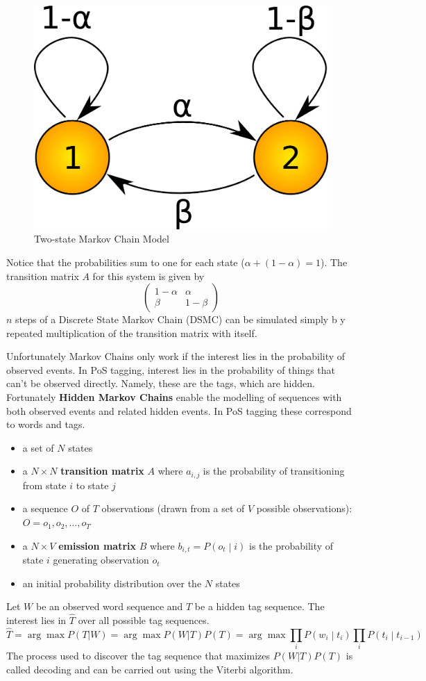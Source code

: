 \documentclass[11pt]{article}
\begin{document}
\begin{figure}[H]
	\centering
	\includegraphics[width=0.4\linewidth]{img/two_state_markov_model.png}
	\caption{Two-state Markov Chain Model \parencite{markov}}
\end{figure}

Notice that the probabilities sum to one for each state ($ \alpha + (1-\alpha) = 1$). The transition matrix $A$ for this system is given by
\begin{equation*}
	\begin{pmatrix}
	1-\alpha & \alpha\\
	\beta & 1-\beta
	\end{pmatrix}
\end{equation*}
$n$ steps of a Discrete State Markov Chain (DSMC) can be simulated simply b y repeated multiplication of the transition matrix with itself.

Unfortunately Markov Chains only work if the interest lies in the probability of observed events. In PoS tagging, interest lies in the probability of things that can't be observed directly. Namely, these are the tags, which are hidden. Fortunately \textbf{Hidden Markov Chains} enable the modelling of sequences with both observed events and related hidden events. In PoS tagging these correspond to words and tags.
\begin{itemize}
	\item a set of $N$ states
	\item a $N\times N$ \textbf{transition matrix} $A$ where $a_{i,j}$ is the probability of transitioning from state $i$ to state $j$
	\item a sequence $O$ of $T$ observations (drawn from a set of $V$ possible observations): $O = o_1, o_2, \dots, o_T$
	\item a $N\times V$ \textbf{emission matrix} $B$ where $b_{i,t} = P\left(o_t\middle| i\right)$ is the probability of state $i$ generating observation $o_t$
	\item an initial probability distribution over the $N$ states
\end{itemize}
Let $W$ be an observed word sequence and $T$ be a hidden tag sequence. The interest lies in $\hat{T}$ over all possible tag sequences.
\begin{equation*}
	\hat{T} = \arg\max P(T|W) =\arg\max P(W|T)P(T) = \arg\max \prod_{i} P\left( w_i \middle| t_i \right) \prod_{i} P\left( t_i \middle| t_{i-1} \right)
\end{equation*}
The process used to discover the tag sequence that maximizes $P(W|T)P(T)$ is called decoding and can be carried out using the Viterbi algorithm.
\end{document}
